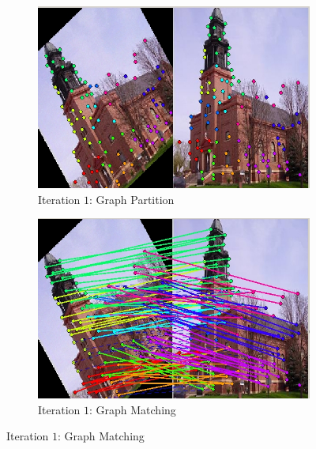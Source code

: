 \documentclass[
	fontsize=12pt,
	paper=a4,
	twoside=false,
	numbers=noenddot,
	plainheadsepline,
	toc=listof,
	toc=bibliography
]{scrartcl}
\begin{document}
\begin{figure}[h]
	\begin{subfigure}[b]{0.5\textwidth}
		\centering
		\includegraphics[scale=0.35]{fig/method2/test_imagetrafo3/partition_it1.jpg} 
		\caption{Iteration $1$: Graph Partition} 
	\end{subfigure}%
	\begin{subfigure}[b]{0.5\textwidth}
		\centering
		\includegraphics[scale=0.35]{fig/method2/test_imagetrafo3/LL_it1.jpg} 
		\caption{Iteration $1$: Graph Matching} 
	\end{subfigure} 
	

\end{figure}
\end{document}
